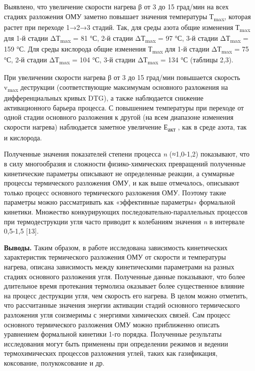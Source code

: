 \begin{multicols}{2}
Выявлено, что увеличение скорости нагрева β от 3 до 15 град/мин на всех
стадиях разложения ОМУ заметно повышает значения температуры
Т\textsubscript{max}, которая растет при переходе 1→2→3 стадий. Так, для
среды азота общие изменения Т\textsubscript{max} для 1-й стадии
ΔТ\textsubscript{max} = 81 °С, 2-й стадии ΔТ\textsubscript{max} = 97 °С,
3-й стадии ΔТ\textsubscript{max} = 159 °С. Для среды кислорода общие
изменения Т\textsubscript{max} для 1-й стадии ΔТ\textsubscript{max} = 75
°С, 2-й стадии ΔТ\textsubscript{max} = 104 °С, 3-й стадии
ΔТ\textsubscript{max} = 134 °С (таблицы 2,3).

При увеличении скорости нагрева β от 3 до 15 град/мин повышается
скорость v\textsubscript{max} деструкции (соответствующие максимумам
основного разложения на дифференциальных кривых DTG), а также
наблюдается снижение активационного барьера процесса. С повышением
температуры при переходе от одной стадии основного разложения к другой
(на всем диапазоне изменения скорости нагрева) наблюдается заметное
увеличение Е\textsubscript{акт} , как в среде азота, так и кислорода.

Полученные значения показателей степени процесса \emph{n} (≈1,0-1,2)
показывают, что в силу многообразия и сложности физико-химических
превращений полученные кинетические параметры описывают не определенные
реакции, а суммарные процессы термического разложения ОМУ, и как выше
отмечалось, описывают только процесс основного термического разложения
ОМУ. Поэтому такие параметры можно рассматривать как «эффективные
параметры» формальной кинетики. Множество конкурирующих
последовательно-параллельных процессов при термодеструкции угля часто
приводит к колебаниям значения \emph{n} в интервале 0,5-1,5 {[}13{]}.

{\bfseries Выводы.} Таким образом, в работе исследована зависимость
кинетических характеристик термического разложения ОМУ от скорости и
температуры нагрева, описана зависимость между кинетическими параметрами
на разных стадиях основного разложения угля. Полученные данные
показывают, что более длительное время протекания термолиза оказывает
более существенное влияние на процесс деструкции угля, чем скорость его
нагрева. В целом можно отметить, что рассчитанные значения энергии
активации стадий основного термического разложения угля соизмеримы с
энергиями химических связей. Сам процесс основного термического
разложения ОМУ можно приближенно описать уравнением формальной кинетики
1-го порядка. Полученные результаты исследования могут быть применены
при определении режимов и ведении термохимических процессов разложения
углей, таких как газификация, коксование, полукоксование и др.
\end{multicols}

